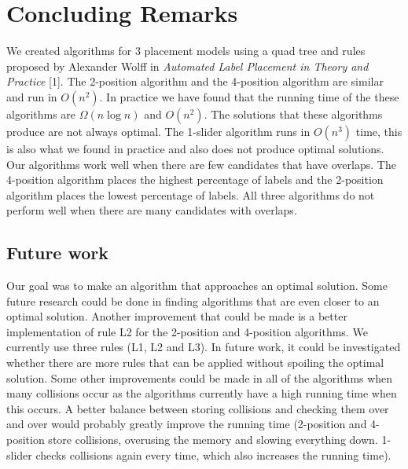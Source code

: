 \documentclass[crop=false,a4paper,oneside,11pt]{standalone}
\begin{document}
\section{Concluding Remarks}
We created algorithms for 3 placement models using a quad tree and rules proposed by Alexander Wolff in \emph{Automated Label Placement in Theory and Practice} [1]. The 2-position algorithm and the 4-position algorithm are similar and run in $O(n^2)$. In practice we have found that the running time of the these algorithms are $\Omega(n\log n)$ and $O(n^2)$. The solutions that these algorithms produce are not always optimal. The 1-slider algorithm runs in $O(n^3)$ time, this is also what we found in practice and also does not produce optimal solutions. Our algorithms work well when there are few candidates that have overlaps. The 4-position algorithm places the highest percentage of labels and the 2-position algorithm places the lowest percentage of labels. All three algorithms do not perform well when there are many candidates with overlaps.

\subsection{Future work}
Our goal was to make an algorithm that approaches an optimal solution. Some future research could be done in finding algorithms that are even closer to an optimal solution. Another improvement that could be made is a better implementation of rule L2 for the 2-position and 4-position algorithms. We currently use three rules (L1, L2 and L3). In future work, it could be investigated whether there are more rules that can be applied without spoiling the optimal solution. Some other improvements could be made in all of the algorithms when many collisions occur as the algorithms currently have a high running time when this occurs. A better balance between storing collisions and checking them over and over would probably greatly improve the running time (2-position and 4-position store collisions, overusing the memory and slowing everything down. 1-slider checks collisions again every time, which also increases the running time). 
\end{document}
